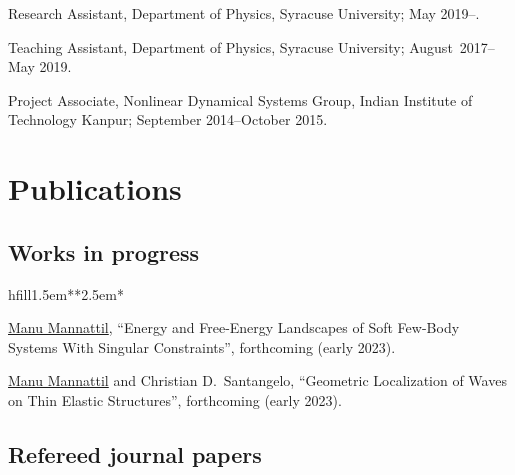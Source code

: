 \documentclass[10pt,a4paper,article,oneside]{memoir}
\def\bname{\underline{Manu Mannattil}}    %
\begin{document}
Research Assistant, Department of Physics, Syracuse University; May 2019--.

Teaching Assistant, Department of Physics, Syracuse University; August~2017--May 2019.

Project Associate, Nonlinear Dynamical Systems Group, Indian Institute of Technology Kanpur; September 2014--October 2015.


\section{Publications}

\subsection{Works in progress}

\begin{flexlabelled}{hfill}{1.5em}{*}{*}{2.5em}{*}
  \setlength{\itemsep}{-0.25em}
  \item[2.] {\bname}, ``Energy and Free-Energy Landscapes of Soft Few-Body Systems With Singular Constraints'', forthcoming (early 2023).
  \item[1.] {\bname} and Christian D.~Santangelo, ``Geometric Localization of Waves on Thin Elastic Structures'', forthcoming (early 2023).
\end{flexlabelled}

\subsection{Refereed journal papers}
\end{document}
